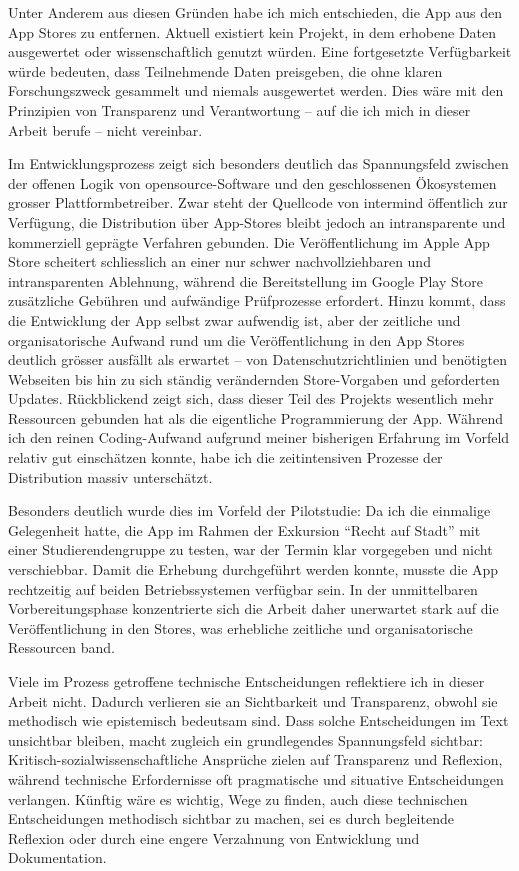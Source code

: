 Unter Anderem aus diesen Gründen habe ich mich entschieden, die App aus den App Stores zu entfernen. Aktuell existiert kein Projekt, in dem erhobene Daten ausgewertet oder wissenschaftlich genutzt würden. Eine fortgesetzte Verfügbarkeit würde bedeuten, dass Teilnehmende Daten preisgeben, die ohne klaren Forschungszweck gesammelt und niemals ausgewertet werden. Dies wäre mit den Prinzipien von Transparenz und Verantwortung -- auf die ich mich in dieser Arbeit berufe -- nicht vereinbar.

\vspace{1em}

Im Entwicklungsprozess zeigt sich besonders deutlich das Spannungsfeld zwischen der offenen Logik von \gls{opensource}-Software und den geschlossenen Ökosystemen grosser Plattformbetreiber. Zwar steht der Quellcode von \gls{intermind} öffentlich zur Verfügung, die Distribution über App-Stores bleibt jedoch an intransparente und kommerziell geprägte Verfahren gebunden. Die Veröffentlichung im Apple App Store scheitert schliesslich an einer nur schwer nachvollziehbaren und intransparenten Ablehnung, während die Bereitstellung im Google Play Store zusätzliche Gebühren und aufwändige Prüfprozesse erfordert. Hinzu kommt, dass die Entwicklung der App selbst zwar aufwendig ist, aber der zeitliche und organisatorische Aufwand rund um die Veröffentlichung in den App Stores deutlich grösser ausfällt als erwartet -- von Datenschutzrichtlinien und benötigten Webseiten bis hin zu sich ständig verändernden Store-Vorgaben und geforderten Updates. Rückblickend zeigt sich, dass dieser Teil des Projekts wesentlich mehr Ressourcen gebunden hat als die eigentliche Programmierung der App. Während ich den reinen Coding-Aufwand aufgrund meiner bisherigen Erfahrung im Vorfeld relativ gut einschätzen konnte, habe ich die zeitintensiven Prozesse der Distribution massiv unterschätzt.

Besonders deutlich wurde dies im Vorfeld der Pilotstudie: Da ich die einmalige Gelegenheit hatte, die App im Rahmen der Exkursion \enquote{Recht auf Stadt} mit einer Studierendengruppe zu testen, war der Termin klar vorgegeben und nicht verschiebbar. Damit die Erhebung durchgeführt werden konnte, musste die App rechtzeitig auf beiden Betriebssystemen verfügbar sein. In der unmittelbaren Vorbereitungsphase konzentrierte sich die Arbeit daher unerwartet stark auf die Veröffentlichung in den Stores, was erhebliche zeitliche und organisatorische Ressourcen band. 

Viele im Prozess getroffene technische Entscheidungen reflektiere ich in dieser Arbeit nicht. Dadurch verlieren sie an Sichtbarkeit und Transparenz, obwohl sie methodisch wie epistemisch bedeutsam sind. Dass solche Entscheidungen im Text unsichtbar bleiben, macht zugleich ein grundlegendes Spannungsfeld sichtbar: Kritisch-sozialwissenschaftliche Ansprüche zielen auf Transparenz und Reflexion, während technische Erfordernisse oft pragmatische und situative Entscheidungen verlangen. Künftig wäre es wichtig, Wege zu finden, auch diese technischen Entscheidungen methodisch sichtbar zu machen, sei es durch begleitende Reflexion oder durch eine engere Verzahnung von Entwicklung und Dokumentation.


